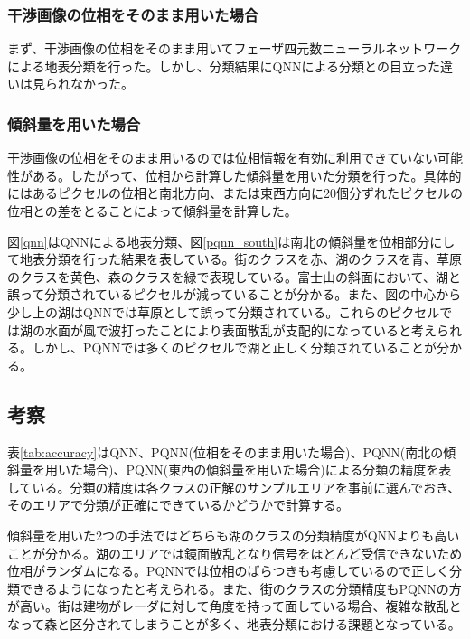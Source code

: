 \documentclass[a4j, twocolumn]{jsarticle}
\begin{document}
\subsubsection{干渉画像の位相をそのまま用いた場合}
まず、干渉画像の位相をそのまま用いてフェーザ四元数ニューラルネットワークによる地表分類を行った。しかし、分類結果にQNNによる分類との目立った違いは見られなかった。

\subsubsection{傾斜量を用いた場合}
干渉画像の位相をそのまま用いるのでは位相情報を有効に利用できていない可能性がある。したがって、位相から計算した傾斜量を用いた分類を行った。具体的にはあるピクセルの位相と南北方向、または東西方向に20個分ずれたピクセルの位相との差をとることによって傾斜量を計算した。

図\ref{qnn}はQNNによる地表分類、図\ref{pqnn_south}は南北の傾斜量を位相部分にして地表分類を行った結果を表している。街のクラスを赤、湖のクラスを青、草原のクラスを黄色、森のクラスを緑で表現している。富士山の斜面において、湖と誤って分類されているピクセルが減っていることが分かる。また、図の中心から少し上の湖はQNNでは草原として誤って分類されている。これらのピクセルでは湖の水面が風で波打ったことにより表面散乱が支配的になっていると考えられる。しかし、PQNNでは多くのピクセルで湖と正しく分類されていることが分かる。

\subsection{考察}
表\ref{tab:accuracy}はQNN、PQNN(位相をそのまま用いた場合)、PQNN(南北の傾斜量を用いた場合)、PQNN(東西の傾斜量を用いた場合)による分類の精度を表している。分類の精度は各クラスの正解のサンプルエリアを事前に選んでおき、そのエリアで分類が正確にできているかどうかで計算する。

傾斜量を用いた2つの手法ではどちらも湖のクラスの分類精度がQNNよりも高いことが分かる。湖のエリアでは鏡面散乱となり信号をほとんど受信できないため位相がランダムになる。PQNNでは位相のばらつきも考慮しているので正しく分類できるようになったと考えられる。また、街のクラスの分類精度もPQNNの方が高い。街は建物がレーダに対して角度を持って面している場合、複雑な散乱となって森と区分されてしまうことが多く、地表分類における課題となっている。
\end{document}
